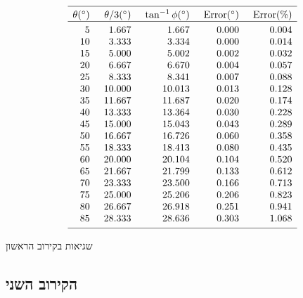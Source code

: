 \begin{table}[t]
\[
%
\begin{array}{r@{\hspace{5mm}}r@{\hspace{5mm}}r@{\hspace{5mm}}r@{\hspace{5mm}}r}
\hline
\noalign{\smallskip}
\theta ({}^\circ) & \theta/3 ({}^\circ)& \tan^{-1} \phi ({}^\circ) & \mathrm{Error} ({}^\circ) & \mathrm{Error (\%)}\\\hline
\noalign{\smallskip}
  5 &    1.667 &    1.667  &     0.000 &    0.004 \\
 10 &    3.333 &    3.334  &     0.000 &    0.014 \\
 15 &    5.000 &    5.002  &     0.002 &    0.032 \\
 20 &    6.667 &    6.670  &     0.004 &    0.057 \\
 25 &    8.333 &    8.341  &     0.007 &    0.088 \\
 30 &   10.000 &   10.013  &     0.013 &    0.128 \\
 35 &   11.667 &   11.687  &     0.020 &    0.174 \\
 40 &   13.333 &   13.364  &     0.030 &    0.228 \\
 45 &   15.000 &   15.043  &     0.043 &    0.289 \\
 50 &   16.667 &   16.726  &     0.060 &    0.358 \\
 55 &   18.333 &   18.413  &     0.080 &    0.435 \\
 60 &   20.000 &   20.104  &     0.104 &    0.520 \\
 65 &   21.667 &   21.799  &     0.133 &    0.612 \\
 70 &   23.333 &   23.500  &     0.166 &    0.713 \\
 75 &   25.000 &   25.206  &     0.206 &    0.823 \\
 80 &   26.667 &   26.918  &     0.251 &    0.941 \\
 85 &   28.333 &   28.636  &     0.303 &    1.068 \\
 \noalign{\smallskip}
 \hline
 \end{array}
\]
\caption{שגיאות בקירוב הראשון}\label{t.trisect-first}
\end{table}


\subsection{הקירוב השני}

